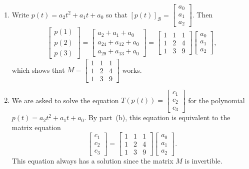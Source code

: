 \documentclass[12pt,letterpaper]{article}
\begin{document}
\begin{enumerate}
\begin{enumerate}
Both equalities are immediate since $(p+q)(t)$ is defined to equal
$p(t) + q(t)$ and $(cp)(t)$ is defined to equal $c(p(t))$ for every
value of $t$.
\item Write $p(t) = a_2t^2 + a_1t + a_0$ so that $[p(t)]_{\mathcal{B}}
= \begin{bmatrix}a_0\\a_1\\a_2\end{bmatrix}$. 
Then $$\begin{bmatrix}p(1)\\p(2)\\p(3)\end{bmatrix}
= \begin{bmatrix}a_2 + a_1 + a_0\\a_24 + a_12 + a_0\\a_29 + a_13 +
  a_0\end{bmatrix}
= \begin{bmatrix}1&1&1\\1&2&4\\1&3&9\end{bmatrix}\begin{bmatrix}a_0\\a_1\\a_2\end{bmatrix},$$
which shows that $M = \begin{bmatrix}1&1&1\\1&2&4\\1&3&9\end{bmatrix}$ works.
\item We are asked to solve the equation $T(p(t))
= \begin{bmatrix}c_1\\c_2\\c_3\end{bmatrix}$ for the polynomial $p(t)
= a_2t^2 + a_1t + a_0$.
By part~(b), this equation is equivalent to the matrix
equation $$\begin{bmatrix}c_1\\c_2\\c_3\end{bmatrix}
= \begin{bmatrix}1&1&1\\1&2&4\\1&3&9\end{bmatrix}\begin{bmatrix}a_0\\a_1\\a_2\end{bmatrix}.$$
This equation always has a solution since the matrix $M$ is invertible.
\end{enumerate}



\end{enumerate}
\end{document}
